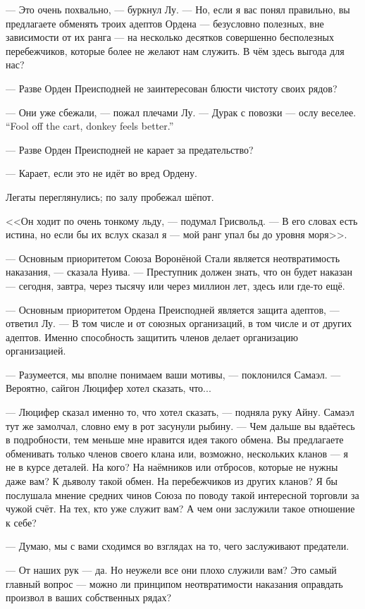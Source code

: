 --- Это очень похвально, --- буркнул Лу.
--- Но, если я вас понял правильно, вы предлагаете обменять троих адептов Ордена --- безусловно полезных, вне зависимости от их ранга --- на несколько десятков совершенно бесполезных перебежчиков, которые более не желают нам служить.
В чём здесь выгода для нас?

--- Разве Орден Преисподней не заинтересован блюсти чистоту своих рядов?

--- Они уже сбежали, --- пожал плечами Лу.
{--- Дурак с повозки --- ослу веселее.}
{``Fool off the cart, donkey feels better.''}

--- Разве Орден Преисподней не карает за предательство?

--- Карает, если это не идёт во вред Ордену.

Легаты переглянулись;
по залу пробежал шёпот.

<<Он ходит по очень тонкому льду, --- подумал Грисвольд.
--- В его словах есть истина, но если бы их вслух сказал я --- мой ранг упал бы до уровня моря>>.

--- Основным приоритетом Союза Воронёной Стали является неотвратимость наказания, --- сказала Нуива.
--- Преступник должен знать, что он будет наказан --- сегодня, завтра, через тысячу или через миллион лет, здесь или где-то ещё.

--- Основным приоритетом Ордена Преисподней является защита адептов, --- ответил Лу.
--- В том числе и от союзных организаций, в том числе и от других адептов.
Именно способность защитить членов делает организацию организацией.

--- Разумеется, мы вполне понимаем ваши мотивы, --- поклонился Самаэл.
--- Вероятно, сайгон Люцифер хотел сказать, что...

--- Люцифер сказал именно то, что хотел сказать, --- подняла руку Айну.
Самаэл тут же замолчал, словно ему в рот засунули рыбину.
--- Чем дальше вы вдаётесь в подробности, тем меньше мне нравится идея такого обмена.
Вы предлагаете обменивать только членов своего клана или, возможно, нескольких кланов --- я не в курсе деталей.
На кого?
На наёмников или отбросов, которые не нужны даже вам?
К дьяволу такой обмен.
На перебежчиков из других кланов?
Я бы послушала мнение средних чинов Союза по поводу такой интересной торговли за чужой счёт.
На тех, кто уже служит вам?
А чем они заслужили такое отношение к себе?

--- Думаю, мы с вами сходимся во взглядах на то, чего заслуживают предатели.

--- От наших рук --- да.
Но неужели все они плохо служили вам?
Это самый главный вопрос --- можно ли принципом неотвратимости наказания оправдать произвол в ваших собственных рядах?

